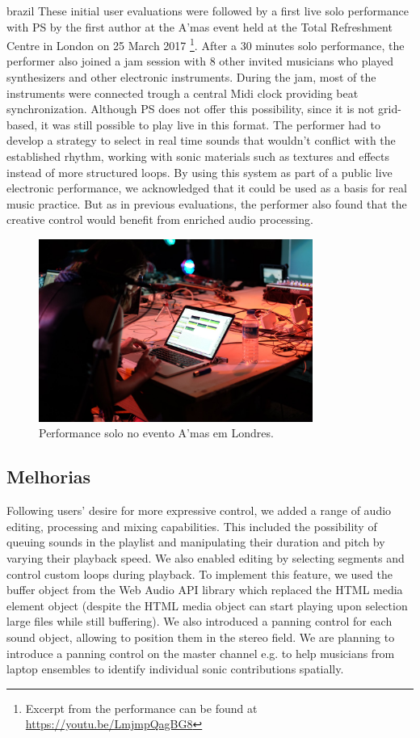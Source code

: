 \begin{otherlanguage*}{brazil}
These initial user evaluations were followed by a first live solo performance with PS by the first author at the A'mas event held at the Total Refreshment Centre in London on 25 March 2017 \footnote{Excerpt from the performance can be found at \url{https://youtu.be/LmjmpQagBG8}}. After a 30 minutes solo performance, the performer also joined a jam session with 8 other invited musicians who played synthesizers and other electronic instruments. During the jam, most of the instruments were connected trough a central Midi clock providing beat synchronization. Although PS does not offer this possibility, since it is not grid-based, it was still possible to play live in this format. The performer had to develop a strategy to select in real time sounds that wouldn't conflict with the established rhythm, working with sonic materials such as textures and effects instead of more structured loops. By using this system as part of a public live electronic performance, we acknowledged that it could be used as a basis for real music practice. But as in previous evaluations, the performer also found that the creative control would benefit from enriched audio processing.

\begin{figure}
\centering
\includegraphics[width=0.8\textwidth]{pictures/cap4/ariane_amas}
\caption{\label{amas}Performance solo no evento A'mas em Londres.}
\label{fig:amas}
\end{figure}

\subsection{Melhorias}

Following users' desire for more expressive control, we added a range of audio editing, processing and mixing capabilities. This included the possibility of queuing sounds in the playlist and manipulating their duration and pitch by varying their playback speed. We also enabled editing by selecting segments and control custom loops during playback. To implement this feature, we used the buffer object from the Web Audio API library which replaced the HTML media element object (despite the HTML media object can start playing upon selection large files while still buffering). We also introduced a panning control for each sound object, allowing to position them in the stereo field. We are planning to introduce a panning control on the master channel e.g. to help musicians from laptop ensembles to identify individual sonic contributions spatially.


\end{otherlanguage*}
